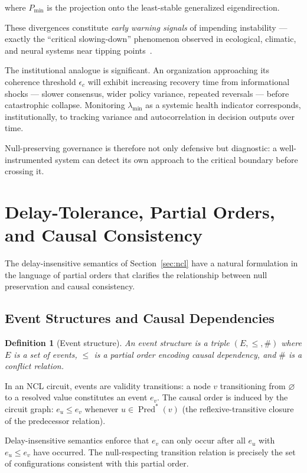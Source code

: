 \documentclass[11pt]{article}
\newtheorem{definition}{Definition}
\theoremstyle{remark}
\begin{document}
where $P_{\min}$ is the projection onto the least-stable generalized eigendirection.

These divergences constitute \emph{early warning signals} of impending instability --- exactly the ``critical slowing-down'' phenomenon observed in ecological, climatic, and neural systems near tipping points~\cite{scheffer}.

The institutional analogue is significant. An organization approaching its coherence threshold $\epsilon_c$ will exhibit increasing recovery time from informational shocks --- slower consensus, wider policy variance, repeated reversals --- before catastrophic collapse. Monitoring $\lambda_{\min}$ as a systemic health indicator corresponds, institutionally, to tracking variance and autocorrelation in decision outputs over time.

Null-preserving governance is therefore not only defensive but diagnostic: a well-instrumented system can detect its own approach to the critical boundary before crossing it.

\section{Delay-Tolerance, Partial Orders, and Causal Consistency}
\label{sec:causal}

The delay-insensitive semantics of Section~\ref{sec:ncl} have a natural formulation in the language of partial orders that clarifies the relationship between null preservation and causal consistency.

\subsection{Event Structures and Causal Dependencies}

\begin{definition}[Event structure]
An event structure is a triple $(E, \leq, \#)$ where $E$ is a set of events, $\leq$ is a partial order encoding causal dependency, and $\#$ is a conflict relation.
\end{definition}

In an NCL circuit, events are validity transitions: a node $v$ transitioning from $\varnothing$ to a resolved value constitutes an event $e_v$. The causal order is induced by the circuit graph: $e_u \leq e_v$ whenever $u \in \operatorname{Pred}^*(v)$ (the reflexive-transitive closure of the predecessor relation).

Delay-insensitive semantics enforce that $e_v$ can only occur after all $e_u$ with $e_u \leq e_v$ have occurred. The null-respecting transition relation is precisely the set of configurations consistent with this partial order.
\end{document}
